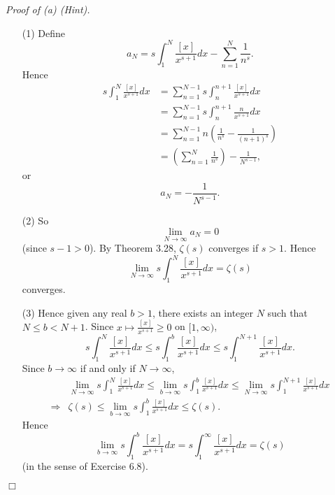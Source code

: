 \documentclass{article}
\begin{document}
\emph{Proof of (a) (Hint).}
\begin{enumerate}
  \item[(1)]
  Define
  \[
    a_N = s \int_{1}^{N} \frac{[x]}{x^{s+1}} dx - \sum_{n=1}^{N} \frac{1}{n^s}.
  \]
  Hence
  \begin{align*}
    s \int_{1}^{N} \frac{[x]}{x^{s+1}} dx
    &=
    \sum_{n=1}^{N-1} s \int_{n}^{n+1} \frac{[x]}{x^{s+1}} dx \\
    &=
    \sum_{n=1}^{N-1} s \int_{n}^{n+1} \frac{n}{x^{s+1}} dx \\
    &=
    \sum_{n=1}^{N-1} n \left( \frac{1}{n^s} - \frac{1}{(n+1)^s} \right) \\
    &=
    \left( \sum_{n=1}^N \frac{1}{n^s} \right) - \frac{1}{N^{s-1}},
  \end{align*}
  or
  \[
    a_N = -\frac{1}{N^{s-1}}.
  \]

  \item[(2)]
  So
  \[
    \lim_{N \to \infty} a_N = 0
  \]
  (since $s - 1 > 0$).
  By Theorem 3.28, $\zeta(s)$ converges if $s > 1$.
  Hence
  \[
    \lim_{N \to \infty} s \int_{1}^{N} \frac{[x]}{x^{s+1}} dx = \zeta(s)
  \]
  converges.

  \item[(3)]
  Hence given any real $b > 1$, there exists an integer $N$ such that $N \leq b < N+1$.
  Since $x \mapsto \frac{[x]}{x^{s+1}} \geq 0$ on $[1,\infty)$,
  \[
    s \int_{1}^{N} \frac{[x]}{x^{s+1}} dx
    \leq
    s \int_{1}^{b} \frac{[x]}{x^{s+1}} dx
    \leq
    s \int_{1}^{N+1} \frac{[x]}{x^{s+1}} dx.
  \]
  Since $b \to \infty$ if and only if $N \to \infty$,
  \begin{align*}
    &\lim_{N \to \infty} s \int_{1}^{N} \frac{[x]}{x^{s+1}} dx
      \leq
      \lim_{b \to \infty} s \int_{1}^{b} \frac{[x]}{x^{s+1}} dx
      \leq
      \lim_{N \to \infty} s \int_{1}^{N+1} \frac{[x]}{x^{s+1}} dx \\
    \Longrightarrow&
      \zeta(s)
      \leq
      \lim_{b \to \infty} s \int_{1}^{b} \frac{[x]}{x^{s+1}} dx
      \leq
      \zeta(s).
  \end{align*}
  Hence
  \[
    \lim_{b \to \infty} s \int_{1}^{b} \frac{[x]}{x^{s+1}} dx
    = s \int_{1}^{\infty} \frac{[x]}{x^{s+1}} dx
    = \zeta(s)
  \]
  (in the sense of Exercise 6.8).
\end{enumerate}
$\Box$ \\
\end{document}

